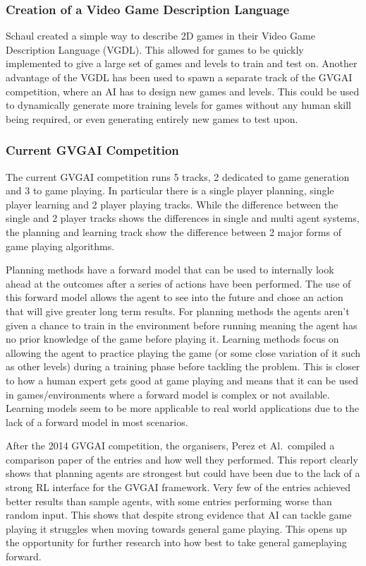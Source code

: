 \documentclass[a4paper]{article}
\begin{document}
\subsubsection{Creation of a Video Game Description Language}
Schaul created a simple way to describe 2D games in their Video Game Description Language (VGDL)\cite{VGDL}.
This allowed for games to be quickly implemented to give a large set of games and levels to train and test on.
Another advantage of the VGDL has been used to spawn a separate track of the GVGAI competition, where an AI has to design new games and levels.
This could be used to dynamically generate more training levels for games without any human skill being required, or even generating entirely new games to test upon.
\subsubsection{Current GVGAI Competition}
The current GVGAI competition runs 5 tracks, 2 dedicated to game generation and 3 to game playing.
In particular there is a single player planning, single player learning and 2 player playing tracks.
While the difference between the single and 2 player tracks shows the differences in single and multi agent systems, the planning and learning track show the difference between 2 major forms of game playing algorithms.
\par
Planning methods have a forward model that can be used to internally look ahead at the outcomes after a series of actions have been performed.
The use of this forward model allows the agent to see into the future and chose an action that will give greater long term results.
For planning methods the agents aren't given a chance to train in the environment before running meaning the agent has no prior knowledge of the game before playing it.
Learning methods focus on allowing the agent to practice playing the game (or some close variation of it such as other levels) during a training phase before tackling the problem.
This is closer to how a human expert gets good at game playing and means that it can be used in games/environments where a forward model is complex or not available.
Learning models seem to be more applicable to real world applications due to the lack of a forward model in most scenarios.
\par
After the 2014 GVGAI competition, the organisers, Perez et Al.\ compiled a comparison paper of the entries and how well they performed\cite{GVGAI2014}.
This report clearly shows that planning agents are strongest but could have been due to the lack of a strong RL interface for the GVGAI framework.
Very few of the entries achieved better results than sample agents, with some entries performing worse than random input.
This shows that despite strong evidence that AI can tackle game playing it struggles when moving towards general game playing.
This opens up the opportunity for further research into how best to take general gameplaying forward.
\end{document}
